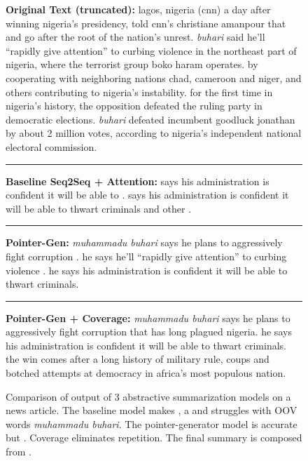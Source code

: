 \documentclass[11pt,a4paper]{article}
\begin{document}
\begin{figure}[h]
\begin{boxedminipage}{\columnwidth}
\scriptsize
\textbf{Original Text (truncated):}
lagos, nigeria (cnn) a day after winning nigeria's presidency,  told cnn's christiane amanpour that  and go after the root of the nation's unrest. \textit{buhari} said he'll ``rapidly give attention'' to curbing violence in the northeast part of nigeria, where the terrorist group boko haram operates. by cooperating with neighboring nations chad, cameroon and niger,  and others contributing to nigeria's instability. for the first time in nigeria's history, the opposition defeated the ruling party in democratic elections. \textit{buhari} defeated incumbent goodluck jonathan by about 2 million votes, according to nigeria's independent national electoral commission. 
\newline \rule{\columnwidth}{1.2pt}
\textbf{Baseline Seq2Seq + Attention:}
 says his administration is confident it will be able to .  says his administration is confident it will be able to thwart criminals and other . 
\newline \rule{\columnwidth}{0.4pt}
\textbf{Pointer-Gen:}
\textit{muhammadu buhari} says he plans to aggressively fight corruption . he says he'll ``rapidly give attention'' to curbing violence .
he says his administration is confident it will be able to thwart criminals.
\newline \rule{\columnwidth}{0.4pt}
\textbf{Pointer-Gen + Coverage:}
\textit{muhammadu buhari} says he plans to aggressively fight corruption that has long plagued nigeria. he says his administration is confident it will be able to thwart criminals. the win comes after a long history of military rule, coups and botched attempts at democracy in africa's most populous nation.
\end{boxedminipage}
\caption{
Comparison of output of 3 abstractive summarization models on a news article.
The baseline model makes , a  and struggles with OOV words \textit{muhammadu buhari}.
The pointer-generator model is accurate but  .
Coverage eliminates repetition.
The final summary is composed from .
}
\label{fig_firstpage}
\end{figure}
 
\end{document}
